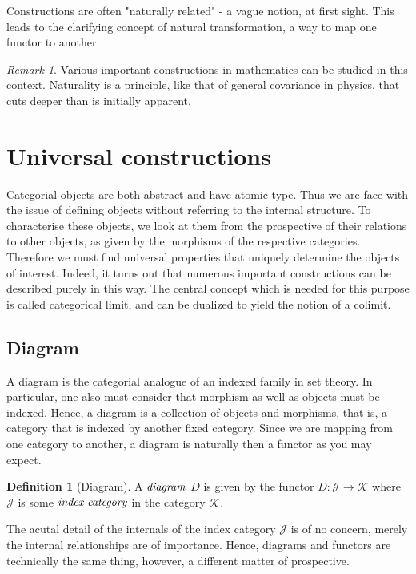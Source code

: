 \documentclass[10pt, oneside, reqno]{amsart}
\theoremstyle{plain}%
\theoremstyle{definition}
\newtheorem{defn}[thm]{Definition}
\theoremstyle{remark}
\newtheorem*{rem}{Remark}
\begin{document}
Constructions are often "naturally related" - a vague notion, at first sight.
This leads to the clarifying concept of natural transformation, a way to map one functor to another.
\begin{rem}
 Various important constructions in mathematics can be studied in this context.
 Naturality is a principle, like that of general covariance in physics, that cuts deeper than is initially apparent.
\end{rem}


\section{Universal constructions} %
\label{sec:universalconstructions}
Categorial objects are both abstract and have atomic type.
Thus we are face with the issue of defining objects without referring to the internal structure.
To characterise these objects, we look at them from the prospective of their relations to other objects, as given by the morphisms 
of the respective categories. Therefore we must find universal properties that uniquely determine the objects of interest.
Indeed, it turns out that numerous important constructions can be described purely in this way.
The central concept which is needed for this purpose is called categorical limit, and can be dualized to yield the notion of a colimit.

\subsection{Diagram} %
\label{subsec:diagram}
A diagram is the categorial analogue of an indexed family in set theory. In particular, one also must consider that
morphism as well as objects must be indexed. Hence, a diagram is a collection of objects and morphisms, that is,
a category that is indexed by another fixed category. Since we are mapping from one category to another, a diagram is
naturally then a functor as you may expect.
\begin{defn}[Diagram]
 A $\emph{diagram}$ $D$ is given by the functor $D: \mathcal{J} \to \mathcal{K}$
 where $\mathcal{J}$ is some $\emph{index category}$ in the category $\mathcal{K}$.
\end{defn}

The acutal detail of the internals of the index category $\mathcal{J}$ is of no concern, merely the internal relationships
are of importance. Hence, diagrams and functors are technically the same thing, however, a different matter of prospective.
\end{document}
